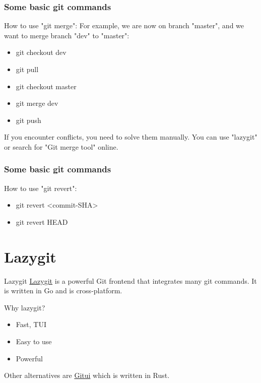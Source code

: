 \documentclass[aspectratio=169]{beamer}
\begin{document}
\begin{frame}
  \frametitle{Some basic git commands}
  How to use "git merge":
  For example, we are now on branch "master", and we want to merge branch "dev" to "master":
  \begin{itemize}
    \item git checkout dev
    \item git pull
    \item git checkout master
    \item git merge dev
    \item git push
  \end{itemize}
  If you encounter conflicts, you need to solve them manually. You can use "lazygit" or search for "Git merge tool" online.
\end{frame}


\begin{frame}
  \frametitle{Some basic git commands}
  How to use "git revert":
  \begin{itemize}
    \item git revert <commit-SHA>
    \item git revert HEAD
  \end{itemize}
\end{frame}

\section{Lazygit}
\begin{frame}{Lazygit}
  \href{https://github.com/jesseduffield/lazygit}{Lazygit} is a powerful Git frontend that integrates many git commands. It is written in Go and is cross-platform.

  \pause

  Why lazygit?
  \begin{itemize}
      \item Fast, TUI
      \item Easy to use
      \item Powerful
  \end{itemize}

  Other alternatives are \href{https://github.com/Extrawurst/gitui}{Gitui} which is written in Rust.
\end{frame}
\end{document}
